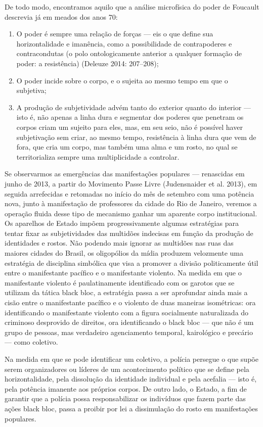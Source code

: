 De todo modo, encontramos aquilo que a análise microfísica do poder de
Foucault descrevia já em meados dos anos 70:

\begin{enumerate}
\item O poder é sempre uma
relação de forças --- eis o que define sua horizontalidade e imanência,
como a possibilidade de contrapoderes e contracondutas (o polo
ontologicamente anterior a qualquer formação de poder: a resistência)
(Deleuze 2014: 207--208);
\item O poder incide sobre o corpo, e o sujeita
ao mesmo tempo em que o subjetiva;
\item A produção de subjetividade advém
tanto do exterior quanto do interior --- isto é, não apenas a linha dura
e segmentar dos poderes que penetram os corpos criam um sujeito para
eles, mas, em seu seio, não é possível haver subjetivação sem criar, ao
mesmo tempo, resistência à linha dura que vem de fora, que cria um
corpo, mas também uma alma e um rosto, no qual se territorializa sempre
uma multiplicidade a controlar.
\end{enumerate}

Se observarmos as emergências das manifestações populares --- renascidas
em junho de 2013, a partir do Movimento Passe Livre (Judensnaider et
al. 2013), em seguida arrefecidas e retomadas no início do mês de
setembro com uma potência nova, junto à manifestação de professores da
cidade do Rio de Janeiro, veremos a operação fluida desse tipo de
mecanismo ganhar um aparente corpo institucional. Os aparelhos de Estado
impõem progressivamente algumas estratégias para tentar fixar as
subjetividades das multidões indecisas em função da produção de
identidades e rostos. Não podendo mais ignorar as multidões nas ruas das
maiores cidades do Brasil, os oligopólios da mídia produzem velozmente
uma estratégia de disciplina simbólica que visa a promover a divisão
politicamente útil entre o manifestante pacífico e o manifestante
violento. Na medida em que o manifestante violento é paulatinamente
identificado com os garotos que se utilizam da tática black bloc, a
estratégia passa a ser aprofundar ainda mais a cisão entre o
manifestante pacífico e o violento de duas maneiras isométricas: ora
identificando o manifestante violento com a figura socialmente
naturalizada do criminoso desprovido de direitos, ora identificando o
black bloc --- que não é um grupo de pessoas, mas verdadeiro agenciamento
temporal, kairológico e precário --- como coletivo.

Na medida em que se pode identificar um coletivo, a polícia persegue o
que supõe serem organizadores ou líderes de um acontecimento político
que se define pela horizontalidade, pela dissolução da identidade
individual e pela acefalia --- isto é, pela potência imanente aos
próprios corpos. De outro lado, o Estado, a fim de garantir que a
polícia possa responsabilizar os indivíduos que fazem parte das ações
black bloc, passa a proibir por lei a dissimulação do rosto em
manifestações populares.

